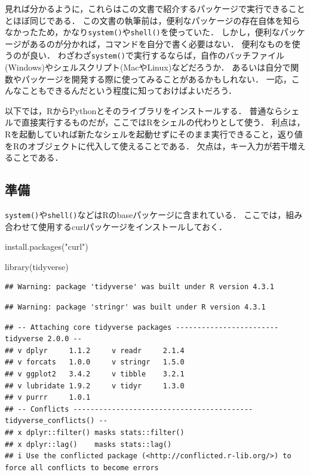 \documentclass[
]{article}
\newenvironment{Shaded}{\begin{snugshade}}{\end{snugshade}}
\newcommand{\FunctionTok}[1]{\textcolor[rgb]{0.00,0.00,0.00}{#1}}
\newcommand{\NormalTok}[1]{#1}
\newcommand{\StringTok}[1]{\textcolor[rgb]{0.31,0.60,0.02}{#1}}
\begin{document}
見れば分かるように，これらはこの文書で紹介するパッケージで実行できることとほぼ同じである．
この文書の執筆前は，便利なパッケージの存在自体を知らなかったため，かなり\texttt{system()}や\texttt{shell()}を使っていた．
しかし，便利なパッケージがあるのが分かれば，コマンドを自分で書く必要はない．
便利なものを使うのが良い．
わざわざ\texttt{system()}で実行するならば，自作のバッチファイル(Windows)やシェルスクリプト(MacやLinux)などだろうか．
あるいは自分で関数やパッケージを開発する際に使ってみることがあるかもしれない．
一応，こんなこともできるんだという程度に知っておけばよいだろう．

以下では，RからPythonとそのライブラリをインストールする．
普通ならシェルで直接実行するものだが，ここではRをシェルの代わりとして使う．
利点は，Rを起動していれば新たなシェルを起動せずにそのまま実行できること，返り値をRのオブジェクトに代入して使えることである．
欠点は，キー入力が若干増えることである．

\hypertarget{ux6e96ux5099-5}{%
\subsection{準備}\label{ux6e96ux5099-5}}

\texttt{system()}や\texttt{shell()}などはRのbaseパッケージに含まれている．
ここでは，組み合わせて使用するcurlパッケージをインストールしておく．

\begin{Shaded}
\begin{Highlighting}[]
\FunctionTok{install.packages}\NormalTok{(}\StringTok{"curl"}\NormalTok{)}
\end{Highlighting}
\end{Shaded}

\begin{Shaded}
\begin{Highlighting}[]
\FunctionTok{library}\NormalTok{(tidyverse)}
\end{Highlighting}
\end{Shaded}

\begin{verbatim}
## Warning: package 'tidyverse' was built under R version 4.3.1
\end{verbatim}

\begin{verbatim}
## Warning: package 'stringr' was built under R version 4.3.1
\end{verbatim}

\begin{verbatim}
## -- Attaching core tidyverse packages ------------------------ tidyverse 2.0.0 --
## v dplyr     1.1.2     v readr     2.1.4
## v forcats   1.0.0     v stringr   1.5.0
## v ggplot2   3.4.2     v tibble    3.2.1
## v lubridate 1.9.2     v tidyr     1.3.0
## v purrr     1.0.1     
## -- Conflicts ------------------------------------------ tidyverse_conflicts() --
## x dplyr::filter() masks stats::filter()
## x dplyr::lag()    masks stats::lag()
## i Use the conflicted package (<http://conflicted.r-lib.org/>) to force all conflicts to become errors
\end{verbatim}
\end{document}
